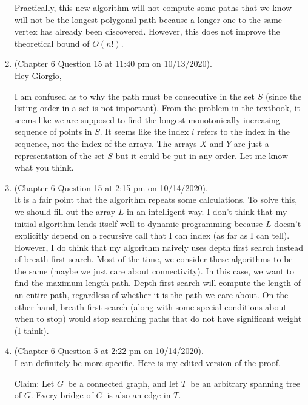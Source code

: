 \documentclass{article}
\begin{document}
\begin{enumerate}
        Practically, this new algorithm will not compute some paths that we know will not be the longest polygonal path because a longer one to the same vertex has already been discovered.
        However, this does not improve the theoretical bound of $O(n!)$.
    \item (Chapter 6 Question 15 at 11:40 pm on 10/13/2020). \\
        Hey Giorgio,

        I am confused as to why the path must be consecutive in the set $S$ (since the listing order in a set is not important).
        From the problem in the textbook, it seems like we are supposed to find the longest monotonically increasing sequence of points in $S$.
        It seems like the index $i$ refers to the index in the sequence, not the index of the arrays.
        The arrays $X$ and $Y$ are just a representation of the set $S$ but it could be put in any order.
        Let me know what you think.
    \item (Chapter 6 Question 15 at 2:15 pm on 10/14/2020). \\
        It is a fair point that the algorithm repeats some calculations. To solve this, we should fill out the array $L$ in an intelligent way. I don't think that my initial algorithm lends itself well to dynamic programming because $L$ doesn't explicitly depend on a recursive call that I can index (as far as I can tell). However, I do think that my algorithm naively uses depth first search instead of breath first search. Most of the time, we consider these algorithms to be the same (maybe we just care about connectivity). In this case, we want to find the maximum length path. Depth first search will compute the length of an entire path, regardless of whether it is the path we care about. On the other hand, breath first search (along with some special conditions about when to stop) would stop searching paths that do not have significant weight (I think).
    \item (Chapter 6 Question 5 at 2:22 pm on 10/14/2020). \\
        I can definitely be more specific. Here is my edited version of the proof.

        Claim: Let $G$ be a connected graph, and let $T$ be an arbitrary spanning tree of $G$.
        Every bridge of $G$ is also an edge in $T$.


\end{enumerate}
\end{document}
